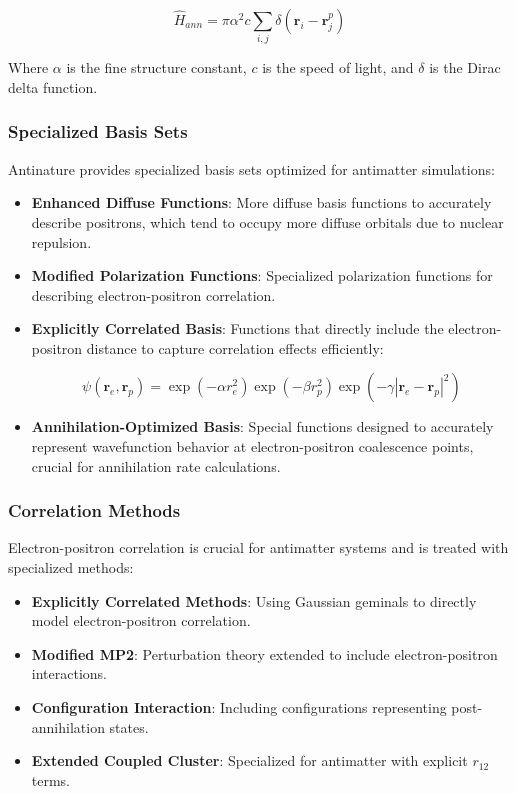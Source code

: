 \documentclass[10pt,twocolumn,a4paper]{article}
\begin{document}
\begin{equation}
    \hat{H}_{ann} = \pi\alpha^2 c \sum_{i,j} \delta(\textbf{r}_i - \textbf{r}_j^p)
\end{equation}

Where $\alpha$ is the fine structure constant, $c$ is the speed of light, and $\delta$ is the Dirac delta function.

\subsubsection{Specialized Basis Sets}
Antinature provides specialized basis sets optimized for antimatter simulations:

\begin{itemize}
    \item \textbf{Enhanced Diffuse Functions}: More diffuse basis functions to accurately describe positrons, which tend to occupy more diffuse orbitals due to nuclear repulsion.
    
    \item \textbf{Modified Polarization Functions}: Specialized polarization functions for describing electron-positron correlation.
    
    \item \textbf{Explicitly Correlated Basis}: Functions that directly include the electron-positron distance to capture correlation effects efficiently:
    
    \begin{equation}
        \psi(\textbf{r}_e, \textbf{r}_p) = \exp(-\alpha r_e^2) \exp(-\beta r_p^2) \exp(-\gamma |\textbf{r}_e - \textbf{r}_p|^2)
    \end{equation}
    
    \item \textbf{Annihilation-Optimized Basis}: Special functions designed to accurately represent wavefunction behavior at electron-positron coalescence points, crucial for annihilation rate calculations.
\end{itemize}

\subsubsection{Correlation Methods}
Electron-positron correlation is crucial for antimatter systems and is treated with specialized methods:

\begin{itemize}
    \item \textbf{Explicitly Correlated Methods}: Using Gaussian geminals to directly model electron-positron correlation.
    
    \item \textbf{Modified MP2}: Perturbation theory extended to include electron-positron interactions.
    
    \item \textbf{Configuration Interaction}: Including configurations representing post-annihilation states.
    
    \item \textbf{Extended Coupled Cluster}: Specialized for antimatter with explicit $r_{12}$ terms.
\end{itemize}
\end{document}
